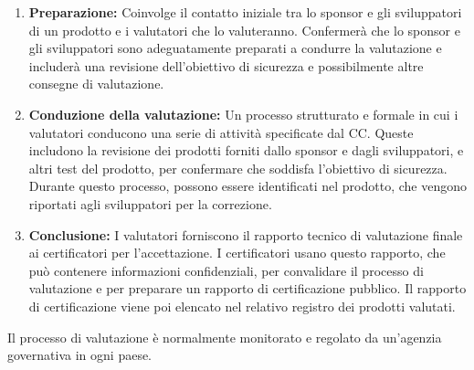\begin{enumerate}
    \item \textbf{Preparazione:} Coinvolge il contatto iniziale tra lo sponsor e gli sviluppatori di un prodotto e i valutatori che lo valuteranno. Confermerà che lo sponsor e gli sviluppatori sono adeguatamente preparati a condurre la valutazione e includerà una revisione dell'obiettivo di sicurezza e possibilmente altre consegne di valutazione.
    
    \item \textbf{Conduzione della valutazione:} Un processo strutturato e formale in cui i valutatori conducono una serie di attività specificate dal CC. Queste includono la revisione dei prodotti forniti dallo sponsor e dagli sviluppatori, e altri test del prodotto, per confermare che soddisfa l'obiettivo di sicurezza. Durante questo processo, possono essere identificati nel prodotto, che vengono riportati agli sviluppatori per la correzione.
    
    \item \textbf{Conclusione:} I valutatori forniscono il rapporto tecnico di valutazione finale ai certificatori per l'accettazione. I certificatori usano questo rapporto, che può contenere informazioni confidenziali, per convalidare il processo di valutazione e per preparare un rapporto di certificazione pubblico. Il rapporto di certificazione viene poi elencato nel relativo registro dei prodotti valutati.

\end{enumerate}
Il processo di valutazione è normalmente monitorato e regolato da un'agenzia governativa in ogni paese.














